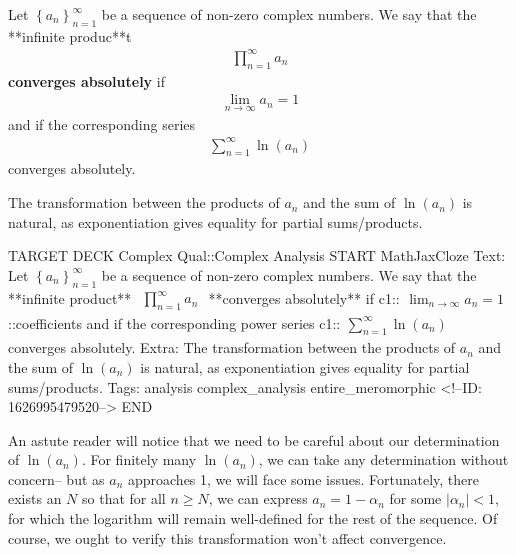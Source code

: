 \documentclass{memoir}
\begin{document}


\begin{defn}
	Let \(\left\{ a_n \right\}_{n=1}^{\infty}\) be a sequence of non-zero complex numbers. We say that the **infinite produc**t
	\begin{align*}
		\prod_{n=1}^{\infty} a_n 
	\end{align*}
	\textbf{converges absolutely} if
	 \begin{align*}
		\lim_{n \to \infty} a_n = 1
	\end{align*}
	and if the corresponding series
	\begin{align*}
		\sum_{n=1}^{\infty} \ln(a_n)
	\end{align*}
	converges absolutely.
\end{defn}
The transformation between the products of \(a_n\) and the sum of \(\ln(a_n)\) is natural, as exponentiation gives equality for partial sums/products.
\begin{anki}
TARGET DECK
Complex Qual::Complex Analysis
START
MathJaxCloze
Text: Let \(\left\{ a_n \right\}_{n=1}^{\infty}\) be a sequence of non-zero complex numbers. We say that the **infinite product**
\(\begin{align*}
  	\prod_{n=1}^{\infty} a_n 
  \end{align*}\)
**converges absolutely** if
{{c1::\( \begin{align*}
      	\lim_{n \to \infty} a_n = 1
        \end{align*}\)::coefficients}}
and if the corresponding power series
{{c1::\(\begin{align*}
        	\sum_{n=1}^{\infty} \ln(a_n)
        \end{align*}\)}} 
converges absolutely.
Extra: The transformation between the products of \(a_n\) and the sum of \(\ln(a_n)\) is natural, as exponentiation gives equality for partial sums/products.
Tags: analysis complex_analysis entire_meromorphic
<!--ID: 1626995479520-->
END
\end{anki}
An astute reader will notice that we need to be careful about our determination of \(\ln(a_n)\).
For finitely many \(\ln(a_n)\), we can take any determination without concern-- but as \(a_n\) approaches 1, we will face some issues.
Fortunately, there exists an \(N\) so that for all \(n\geq N\), we can express \(a_n = 1-\alpha_n\) for some \(\left| \alpha_n \right| <1\), for which the logarithm will remain well-defined for the rest of the sequence.
Of course, we ought to verify this transformation won't affect convergence.
\end{document}
